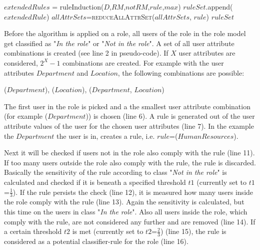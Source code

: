 \begin{algorithm}
\begin{algorithmic}[1]
                                        \State $extendedRules$ = ruleInduction($D$,$RM$,$notRM$,$rule$,$max$)
                                            \State $ruleSet$.append($extendedRule$)
                                                \State $allAttrSets$=\textsc{reduceAllAttrSet}($allAttrSets$, $rule$)
                                            \EndIf
                                        \EndFor
                                        \fi
                                    \EndIf
                                \EndIf
                            \EndIf
                        \EndWhile 
                    \EndWhile
                    \State \Return $ruleSet$
                \EndProcedure
            \end{algorithmic}
        \end{algorithm}
        
    Before the algorithm is applied on a role, all users of the role in the role model get classified as "\textit{In the role}" or "\textit{Not in the role}". A set of all user attribute combinations is created (see line 2 in pseudo-code). If $X$ user attributes are considered, $2^X-1$ combinations are created. For example with the user attributes $Department$ and $Location$, the following combinations are possible:
    
    \centerline{($Department$), ($Location$), ($Department$, $Location$)}
    
    The first user in the role is picked and a the smallest user attribute combination (for example ($Department$)) is chosen (line 6). A rule is generated out of the user attribute values of the user for the chosen user attributes (line 7). In the example the $Department$ the user is in, creates a rule, i.e. $rule$=($HumanResources$).
    
    Next it will be checked if users not in the role also comply with the rule (line 11). If too many users outside the role also comply with the rule, the rule is discarded. Basically the sensitivity of the rule according to class "\textit{Not in the role}" is calculated and checked if it is beneath a specified threshold $t1$ (currently set to $t1$=$\frac{1}{3}$). If the rule persists the check (line 12), it is measured how many users inside the role comply with the rule (line 13). Again the sensitivity is calculated, but this time on the users in class "\textit{In the role}". Also all users inside the role, which comply with the rule, are not considered any further and are removed (line 14). If a certain threshold $t2$ is met (currently set to $t2$=$\frac{2}{3}$) (line 15), the rule is considered as a potential classifier-rule for the role (line 16).
    
